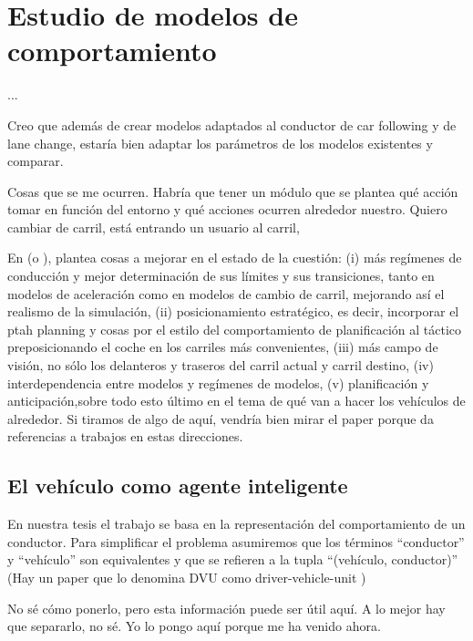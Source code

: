 \chapter{Estudio de modelos de comportamiento}
\label{ch:behavior-models-study}

...

Creo que además de crear modelos adaptados al conductor de car following y de lane change, estaría bien adaptar los parámetros de los modelos existentes y comparar.

Cosas que se me ocurren. Habría que tener un módulo que se plantea qué acción tomar en función del entorno y qué acciones ocurren alrededor nuestro. Quiero cambiar de carril, está entrando un usuario al carril,

En \cite{Toledo2007} (o \cite{Toledo2007-3}), plantea cosas a mejorar en el estado de la cuestión: (i) más regímenes de conducción y mejor determinación de sus límites y sus transiciones, tanto en modelos de aceleración como en modelos de cambio de carril, mejorando así el realismo de la simulación, (ii) posicionamiento estratégico, es decir, incorporar el ptah planning y cosas por el estilo del comportamiento de planificación al táctico preposicionando el coche en los carriles más convenientes, (iii) más campo de visión, no sólo los delanteros y traseros del carril actual y carril destino, (iv) interdependencia entre modelos y regímenes de modelos, (v) planificación y anticipación,sobre todo esto último en el tema de qué van a hacer los vehículos de alrededor. Si tiramos de algo de aquí, vendría bien mirar el paper porque da referencias a trabajos en estas direcciones.

\section{El vehículo como agente inteligente}

En nuestra tesis el trabajo se basa en la representación del comportamiento de un conductor. Para simplificar el problema asumiremos que los términos \enquote{conductor} y \enquote{vehículo} son equivalentes y que se refieren a la tupla \enquote{(vehículo, conductor)} (Hay un paper que lo denomina DVU como driver-vehicle-unit \cite{Dia2002})

No sé cómo ponerlo, pero esta información puede ser útil aquí. A lo mejor hay que separarlo, no sé. Yo lo pongo aquí porque me ha venido ahora.

